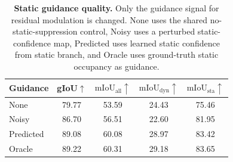 \begin{table}[!tbp]
\caption{\textbf{Static guidance quality.} Only the guidance signal for residual modulation is changed.
None uses the shared no-static-suppression control, Noisy uses a perturbed static-confidence map,
Predicted uses learned static confidence from static branch, and Oracle
uses ground-truth static occupancy as guidance.}
\label{tab:static_guidance_quality}
\centering
\scriptsize
\setlength{\tabcolsep}{2.8pt}
\renewcommand{\arraystretch}{1.08}
\begin{tabular*}{\columnwidth}{@{\extracolsep{\fill}}lcccc@{}}
\toprule
Guidance & gIoU$\uparrow$ & $\mathrm{mIoU}_{\mathrm{all}}\uparrow$ & $\mathrm{mIoU}_{\mathrm{dyn}}\uparrow$ & $\mathrm{mIoU}_{\mathrm{sta}}\uparrow$ \\
\midrule
None & 79.77 & 53.59 & 24.43 & 75.46 \\
Noisy & 86.70 & 56.51 & 22.60 & 81.95 \\
Predicted & 89.08 & 60.08 & 28.97 & 83.42 \\
Oracle & 89.22 & 60.31 & 29.18 & 83.65 \\
\bottomrule
\end{tabular*}
\end{table}
